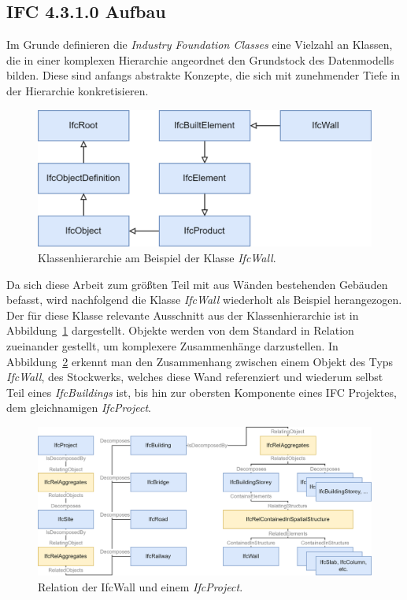 \subsection{IFC 4.3.1.0 Aufbau}
Im Grunde definieren die \textit{Industry Foundation Classes} eine Vielzahl an Klassen, die in einer komplexen Hierarchie angeordnet den Grundstock des Datenmodells bilden.
Diese sind anfangs abstrakte Konzepte, die sich mit zunehmender Tiefe in der Hierarchie konkretisieren.
\begin{figure}[ht]
    \centering
    \includegraphics[width=0.6\columnwidth]{fig/Hierarchie_IfcWall_300.drawio.png}
    \caption{Klassenhierarchie am Beispiel der Klasse \textit{IfcWall}.}\label{fig:IfcWall_Hierarchie}
\end{figure}
Da sich diese Arbeit zum größten Teil mit aus Wänden bestehenden Gebäuden befasst, wird nachfolgend die Klasse \textit{IfcWall} wiederholt als Beispiel herangezogen.
Der für diese Klasse relevante Ausschnitt aus der Klassenhierarchie ist in Abbildung~\ref{fig:IfcWall_Hierarchie} dargestellt.
Objekte werden von dem Standard in Relation zueinander gestellt, um komplexere Zusammenhänge darzustellen.
In Abbildung~\ref{fig:IFC_Relationships} erkennt man den Zusammenhang zwischen einem Objekt des Typs \textit{IfcWall}, des Stockwerks, welches diese Wand referenziert und wiederum selbst Teil eines \textit{IfcBuildings} ist, bis hin zur obersten Komponente eines IFC Projektes, dem gleichnamigen \textit{IfcProject}.

\begin{figure}[h]
    \centering
    \includegraphics[width=0.9\columnwidth]{fig/IFC_Relationships_300.drawio.png}
    \caption{Relation der IfcWall und einem \textit{IfcProject}.}\label{fig:IFC_Relationships}
\end{figure}

